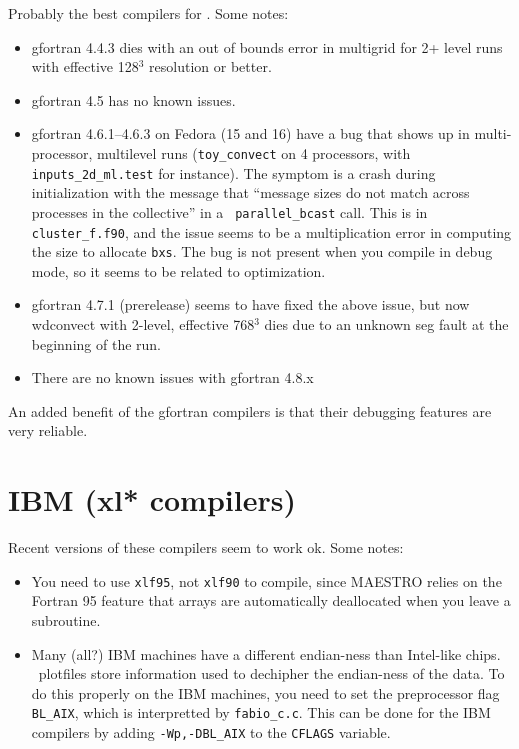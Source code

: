 Probably the best compilers for \maestro.  
Some notes:
\begin{itemize}
\item gfortran 4.4.3 dies with an out of bounds error in multigrid for
2+ level runs with effective 128$^3$ resolution or better.
\item gfortran 4.5 has no known issues.
\item gfortran 4.6.1--4.6.3 on Fedora (15 and 16) have a bug that 
shows up in multi-processor, multilevel runs ({\tt toy\_convect} on 4
processors, with {\tt inputs\_2d\_ml.test} for instance).  The symptom
is a crash during initialization with the message that ``message sizes
do not match across processes in the collective'' in a {\tt
parallel\_bcast} call.  This is in {\tt cluster\_f.f90}, and the issue
seems to be a multiplication error in computing the size to allocate
{\tt bxs}.  The bug is not present when you compile in debug mode, so
it seems to be related to optimization.
\item gfortran 4.7.1 (prerelease) seems to have fixed the above issue,
but now wdconvect with 2-level, effective 768$^3$ dies due to an
unknown seg fault at the beginning of the run.

\item There are no known issues with gfortran 4.8.x

\end{itemize}

An added benefit of the gfortran compilers is that their debugging
features are very reliable.


\section{IBM (xl* compilers)}

Recent versions of these compilers seem to work ok.  Some notes:
\begin{itemize}
\item You need to use {\tt xlf95}, not {\tt xlf90} to compile, since
  MAESTRO relies on the Fortran 95 feature that arrays are
  automatically deallocated when you leave a subroutine.

\item Many (all?) IBM machines have a different endian-ness than
  Intel-like chips.  \boxlib\ plotfiles store information used to
  dechipher the endian-ness of the data.  To do this properly on
  the IBM machines, you need to set the preprocessor flag {\tt BL\_AIX},
  which is interpretted by {\tt fabio\_c.c}.  This can be done for the
  IBM compilers by adding {\tt -Wp,-DBL\_AIX} to the {\tt CFLAGS} variable.

\end{itemize}

